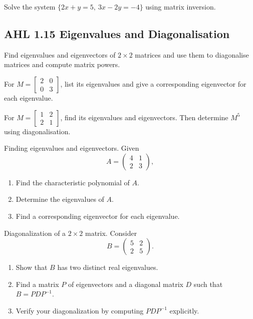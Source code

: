 \documentclass[11pt]{article}
\def\textbf#1{#1}%
\newcommand{\tocsubsection}[1]{\subsection{#1}}
\newcounter{question}
\begin{document}
\begin{question}
Solve the system $\{2x+y=5,\ 3x-2y=-4\}$ using matrix inversion.
\end{question}

\tocsubsection{AHL  1.15  \; Eigenvalues and Diagonalisation}
Find eigenvalues and eigenvectors of $2\times2$ matrices and use them to diagonalise matrices and compute matrix powers.

\begin{question}
For $M=\begin{bmatrix}2&0\\0&3\end{bmatrix}$, list its eigenvalues and give a corresponding eigenvector for each eigenvalue.
\end{question}

\begin{question}
For $M=\begin{bmatrix}1&2\\2&1\end{bmatrix}$, find its eigenvalues and eigenvectors.  Then determine $M^5$ using diagonalisation.
\end{question}


\begin{question}
\textbf{Finding eigenvalues and eigenvectors.}
Given 
\[
A = \begin{pmatrix} 4 & 1 \\ 2 & 3 \end{pmatrix},
\]
\begin{enumerate}
    \item Find the characteristic polynomial of $A$.
    \item Determine the eigenvalues of $A$.
    \item Find a corresponding eigenvector for each eigenvalue.
\end{enumerate}
\end{question}

\begin{question}
\textbf{Diagonalization of a $2\times 2$ matrix.}
Consider 
\[
B = \begin{pmatrix} 5 & 2 \\ 2 & 5 \end{pmatrix}.
\]
\begin{enumerate}
    \item Show that $B$ has two distinct real eigenvalues.
    \item Find a matrix $P$ of eigenvectors and a diagonal matrix $D$ such that $B = PDP^{-1}$.
    \item Verify your diagonalization by computing $PDP^{-1}$ explicitly.
\end{enumerate}
\end{question}
\end{document}
